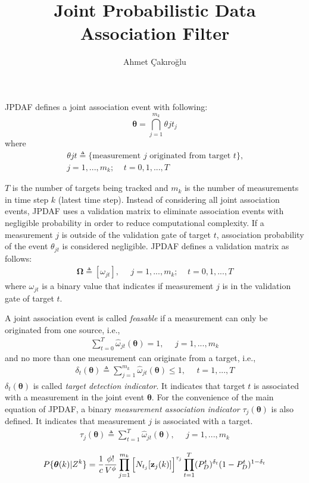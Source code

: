 \documentclass{article}
\title{Joint Probabilistic Data Association Filter}
\author{Ahmet Çakıroğlu}
\date{}
\newcommand{\btheta}{\boldsymbol{\theta}}
\begin{document}
\maketitle

JPDAF defines a joint association event with following:
\begin{equation}
\btheta=\bigcap_{j=1}^{m_k}{\theta{jt_j}}
\end{equation}
where
\begin{gather}\nonumber
{\theta{jt}}\triangleq \text{\{measurement $j$ originated from target $t$\},}\\
j=1,...,m_k;~~~~~t=0,1,...,T
\end{gather}

$T$ is the number of targets being tracked and $m_k$ is the number of measurements in time step $k$ (latest time step). Instead of considering all joint association events, JPDAF uses a validation matrix to eliminate association events with negligible probability in order to reduce computational complexity. If a measurement $j$ is outside of the validation gate of target $t$, association probability of the event $\theta_{jt}$ is considered negligible. JPDAF defines a validation matrix as follows:
\begin{gather}
\boldsymbol{\Omega}\triangleq[\omega_{jt}],~~~~~~j=1,...,m_k;~~~~~t=0,1,...,T
\end{gather}
where $\omega_{jt}$ is a binary value that indicates if measurement $j$ is in the validation gate of target $t$.

A joint association event is called \textit{feasable} if a measurement can only be originated from one source, i.e.,
\begin{gather}
\sum_{t=0}^{T}\hat{\omega}_{jt}(\btheta)=1,~~~~~~j=1,...,m_k
\end{gather}
and no more than one measurement can originate from a target, i.e.,
\begin{gather}
\delta_t(\btheta)\triangleq\sum_{j=1}^{m_k}\hat{\omega}_{jt}(\btheta)\leq1,~~~~~~t=1,...,T
\end{gather}
$\delta_t(\btheta)$ is called \textit{target detection indicator}. It indicates that target $t$ is associated with a measurement in the joint event $\btheta$. For the convenience of the main equation of JPDAF, a binary \textit{measurement association indicator} $\tau_j(\btheta)$ is also defined. It indicates that measurement $j$ is associated with a target.
\begin{gather}
\tau_j(\btheta)\triangleq\sum_{t=1}^{T}\hat{\omega}_{jt}(\btheta),~~~~~~j=1,...,m_k
\end{gather}

\begin{gather}
P\{\btheta(k)|Z^k\}=\frac{1}{c} \dfrac{\phi!}{V^\phi} \prod_{j=1}^{m_k}\Big[N_{t_j}[\bold{z}_j(k)]\Big]^{\tau_j} \prod_{t=1}^T (P^t_D)^{\delta_t}(1-P^t_D)^{1-\delta_t}
\end{gather}


\end{document}
